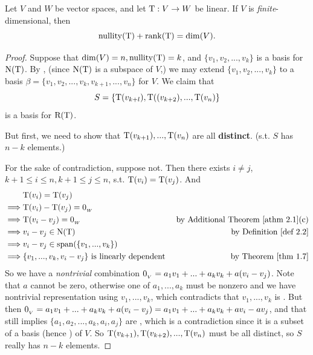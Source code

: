 \begin{theorem}  \label{thm 2.3}
Let \(V\) and \(W\) be vector spaces, and let \(\mathrm{T} : V \to W\) be linear.
If \(V\) is \emph{finite}-dimensional, then
\[
    \mathrm{nullity}(\mathrm{T}) + \mathrm{rank}(\mathrm{T}) = \dim(V).
\]
\end{theorem}

\begin{proof}
Suppose that \(\dim(V) = n, \mathrm{nullity}(\mathrm{T}) = k\), and \(\{ v_1, v_2, ..., v_k \}\) is a basis for \(\mathrm{N(T)}\).
By , (since \(\mathrm{N(T)}\) is a subspace of \(V\),) we may extend \(\{ v_1, v_2, ..., v_k \}\) to a basis \(\beta = \{ v_1, v_2, ..., v_k, v_{k +1}, ..., v_n \}\) for \(V\).
We claim that
\[
    S = \{ \mathrm{T}(v_{k + l}), \mathrm{T}((v_{k + 2}), ..., \mathrm{T}(v_n) \}
\]
is a basis for \(\mathrm{R(T)}\).

But first, we need to show that \(\mathrm{T}(v_{k + 1}), ..., \mathrm{T}(v_n)\) are all \textbf{distinct}. (s.t. \(S\) has \(n - k\) elements.)

For the sake of contradiction, suppose not.
Then there exists \(i \ne j\), \(k + 1 \le i \le n, k + 1 \le j \le n\), s.t. \(\mathrm{T}(v_i) = \mathrm{T}(v_j)\).
And
\begin{align*}
             & \T(v_i) = \T(v_j) \\
    \implies & \T(v_i) - \T(v_j) = \OW \\
    \implies & \T(v_i - v_j) = \OW & \text{by \ATHM{2.1}(c)} \\
    \implies & v_i - v_j \in \NULLT & \text{by \DEF{2.2}} \\
    \implies & v_i - v_j \in \spann(\{ v_1, ..., v_k \}) \\
    \implies & \{ v_1, ..., v_k, v_i - v_j \} \text{ is \LDP{} } & \text{by \THM{1.7}}
\end{align*}
So we have a \emph{nontrivial} combination \(0_{_V} = a_1 v_1 + ... + a_k v_k + a (v_i - v_j)\).
Note that \(a\) cannot be zero, otherwise one of \(a_1, ..., a_k\) must be nonzero and we have nontrivial representation using \(v_1, ..., v_k\), which contradicts that \(v_1, ..., v_k\) is \LID{}.
But then \(0_{_V} = a_1 v_1 + ... + a_k v_k + a (v_i - v_j) = a_1 v_1 + ... + a_k v_k + a v_i - a v_j\), and that still implies \(\{ a_1, a_2, ..., a_k, a_i, a_j \}\) are \LDP{}, which is a contradiction since it is a subset of a basis (hence \LID{}) of \(V\).
So \(\mathrm{T}(v_{k + 1}), \mathrm{T}(v_{k + 2}), ..., \mathrm{T}(v_n)\) must be all distinct, so \(S\) really has \(n - k\) elements.


\end{proof}
